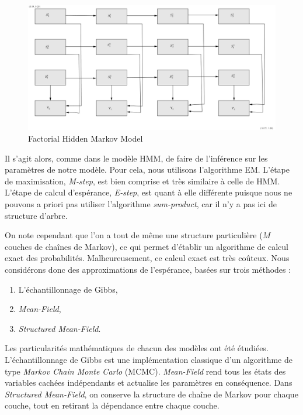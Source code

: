 \documentclass[10pt,a4paper]{article}
\newcommand{\hmm}{\textsc{HMM}}
\newcommand{\mcmc}{\textsc{MCMC}}
\begin{document}
\begin{figure}[hpbt]
  \centering
    \includegraphics[scale=0.7]{../resources/pictures/facthmm.png}
  \caption{Factorial Hidden Markov Model\label{fig:factorial_hmm}}
\end{figure}

Il s'agit alors, comme dans le modèle \hmm{}, de faire de l'inférence sur
les paramètres de notre modèle.
Pour cela, nous utilisons l'algorithme EM.
L'étape de maximisation, \emph{M-step}, est bien comprise et très
similaire à celle de \hmm{}.
L'étape de calcul d'espérance, \emph{E-step}, est quant à elle différente
puisque nous ne pouvons a priori pas utiliser l'algorithme \emph{sum-product},
car il n'y a pas ici de structure d'arbre.

On note cependant que l'on a tout de même une structure particulière ($M$
couches de chaînes de Markov), ce qui permet d'établir un algorithme de calcul
exact des probabilités.
Malheureusement, ce calcul exact est très coûteux.
Nous considérons donc des approximations de l'espérance, basées sur trois
méthodes :

\begin{enumerate}
  \item L'échantillonnage de Gibbs,
  \item \emph{Mean-Field},
  \item \emph{Structured Mean-Field}.
\end{enumerate}

Les particularités mathématiques de chacun des modèles ont été étudiées.
L'échantillonnage de Gibbs est une implémentation classique d'un algorithme de
type \emph{Markov Chain Monte Carlo} (\mcmc).
\emph{Mean-Field} rend tous les états des variables cachées indépendants et
actualise les paramètres en conséquence.
Dans \emph{Structured Mean-Field}, on conserve la structure de chaîne de
Markov pour chaque couche, tout en retirant la dépendance entre chaque couche.
\end{document}
